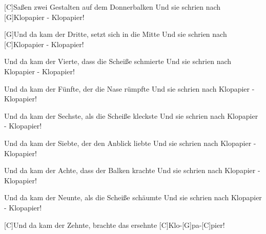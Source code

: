 

\begin{guitar}
	[C]Saßen zwei Gestalten auf dem Donnerbalken
	Und sie schrien nach [G]Klopapier - Klopapier!
	
	[G]Und da kam der Dritte, setzt sich in die Mitte
	Und sie schrien nach [C]Klopapier - Klopapier!
	
	
	Und da kam der Vierte, dass die Scheiße schmierte
	Und sie schrien nach Klopapier - Klopapier!
	
	Und da kam der Fünfte, der die Nase rümpfte
	Und sie schrien nach Klopapier - Klopapier!
	
	Und da kam der Sechste, als die Scheiße kleckste
	Und sie schrien nach Klopapier - Klopapier!
	
	Und da kam der Siebte, der den Anblick liebte
	Und sie schrien nach Klopapier - Klopapier!
	
	Und da kam der Achte, dass der Balken krachte
	Und sie schrien nach Klopapier - Klopapier!
	
	Und da kam der Neunte, als die Scheiße schäumte
	Und sie schrien nach Klopapier - Klopapier!
	
	[C]Und da kam der Zehnte, brachte das ersehnte
	[C]Klo-[G]pa-[C]pier!
	
\end{guitar}